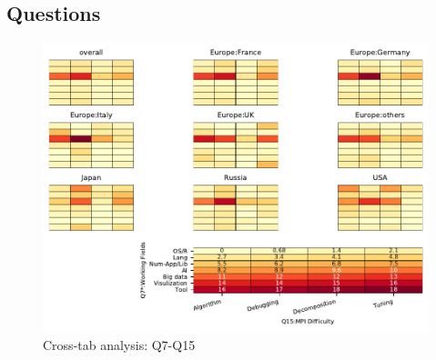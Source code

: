 
\subsection{Questions}


\begin{figure}
\begin{center}
\includegraphics[width=12cm]{../pdfs/Q7-Q15.pdf}
\caption{Cross-tab analysis: Q7-Q15}
\label{fig:Q7-Q15}
\end{center}
\end{figure}
